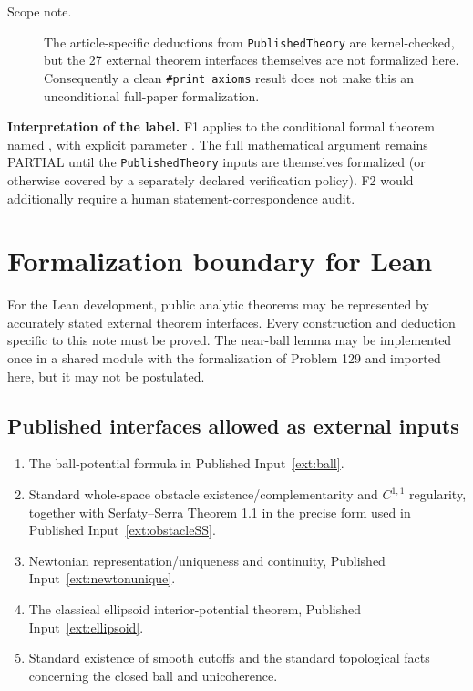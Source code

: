 \documentclass[11pt]{article}
\theoremstyle{definition}
\theoremstyle{remark}
\newcommand{\1}{\mathbf{1}}
\begin{document}
\begin{description}
\item[Scope note.] The article-specific deductions from \texttt{PublishedTheory} are kernel-checked, but the 27 external theorem interfaces themselves are not formalized here. Consequently a clean \texttt{\#print axioms} result does not make this an unconditional full-paper formalization.
\end{description}

\noindent\textbf{Interpretation of the label.} F1 applies to the conditional formal theorem named \texttt{}, with explicit parameter \texttt{}. The full mathematical argument remains PARTIAL until the \texttt{PublishedTheory} inputs are themselves formalized (or otherwise covered by a separately declared verification policy). F2 would additionally require a human statement-correspondence audit.
\endgroup

\section{Formalization boundary for Lean}

For the Lean development, public analytic theorems may be represented by accurately stated external theorem interfaces. Every construction and deduction specific to this note must be proved. The near-ball lemma may be implemented once in a shared module with the formalization of Problem 129 and imported here, but it may not be postulated.

\subsection*{Published interfaces allowed as external inputs}
\begin{enumerate}[label=\textbf{E128.\arabic*.}]
\item The ball-potential formula in Published Input~\ref{ext:ball}.
\item Standard whole-space obstacle existence/complementarity and $C^{1,1}$ regularity, together with Serfaty--Serra Theorem 1.1 in the precise form used in Published Input~\ref{ext:obstacleSS}.
\item Newtonian representation/uniqueness and continuity, Published Input~\ref{ext:newtonunique}.
\item The classical ellipsoid interior-potential theorem, Published Input~\ref{ext:ellipsoid}.
\item Standard existence of smooth cutoffs and the standard topological facts concerning the closed ball and unicoherence.
\end{enumerate}
\end{document}
